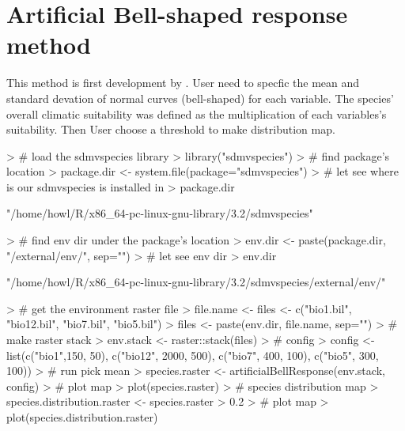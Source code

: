 \documentclass{report}
\begin{document}
\section*{Artificial Bell-shaped response method}
This method is first development by \citet{varela_environmental_2014}.
User need to specfic the mean and standard devation of normal curves (bell-shaped) for each variable. The species' overall climatic suitability was defined as the multiplication of each variables's suitability. Then User choose a threshold to make distribution map.
\begin{Schunk}
\begin{Sinput}
> # load the sdmvspecies library
> library("sdmvspecies")
> # find package's location
> package.dir <- system.file(package="sdmvspecies")
> # let see where is our sdmvspecies is installed in
> package.dir
\end{Sinput}
\begin{Soutput}
[1] "/home/howl/R/x86_64-pc-linux-gnu-library/3.2/sdmvspecies"
\end{Soutput}
\begin{Sinput}
> # find env dir under the package's location
> env.dir <- paste(package.dir, "/external/env/", sep="")
> # let see env dir
> env.dir
\end{Sinput}
\begin{Soutput}
[1] "/home/howl/R/x86_64-pc-linux-gnu-library/3.2/sdmvspecies/external/env/"
\end{Soutput}
\begin{Sinput}
> # get the environment raster file
> file.name <- files <- c("bio1.bil", "bio12.bil", "bio7.bil", "bio5.bil")
> files <- paste(env.dir, file.name, sep="")
> # make raster stack
> env.stack <- raster::stack(files)
> # config
> config <- list(c("bio1",150, 50), c("bio12", 2000, 500), c("bio7", 400, 100), c("bio5", 300, 100))
> # run pick mean
> species.raster <- artificialBellResponse(env.stack, config)
> # plot map
> plot(species.raster)
> # species distribution map
> species.distribution.raster <- species.raster > 0.2
> # plot map
> plot(species.distribution.raster)
\end{Sinput}
\end{Schunk}
\end{document}
